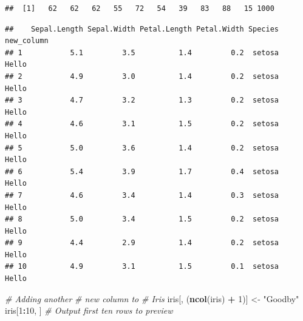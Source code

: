 \documentclass[
]{book}
\newenvironment{Shaded}{\begin{snugshade}}{\end{snugshade}}
\newcommand{\CommentTok}[1]{\textcolor[rgb]{0.56,0.35,0.01}{\textit{#1}}}
\newcommand{\DecValTok}[1]{\textcolor[rgb]{0.00,0.00,0.81}{#1}}
\newcommand{\KeywordTok}[1]{\textcolor[rgb]{0.13,0.29,0.53}{\textbf{#1}}}
\newcommand{\NormalTok}[1]{#1}
\newcommand{\OperatorTok}[1]{\textcolor[rgb]{0.81,0.36,0.00}{\textbf{#1}}}
\newcommand{\StringTok}[1]{\textcolor[rgb]{0.31,0.60,0.02}{#1}}
\begin{document}
\begin{verbatim}
##  [1]   62   62   62   55   72   54   39   83   88   15 1000
\end{verbatim}

\begin{Shaded}
\end{Shaded}

\begin{verbatim}
##    Sepal.Length Sepal.Width Petal.Length Petal.Width Species new_column
## 1           5.1         3.5          1.4         0.2  setosa      Hello
## 2           4.9         3.0          1.4         0.2  setosa      Hello
## 3           4.7         3.2          1.3         0.2  setosa      Hello
## 4           4.6         3.1          1.5         0.2  setosa      Hello
## 5           5.0         3.6          1.4         0.2  setosa      Hello
## 6           5.4         3.9          1.7         0.4  setosa      Hello
## 7           4.6         3.4          1.4         0.3  setosa      Hello
## 8           5.0         3.4          1.5         0.2  setosa      Hello
## 9           4.4         2.9          1.4         0.2  setosa      Hello
## 10          4.9         3.1          1.5         0.1  setosa      Hello
\end{verbatim}

\begin{Shaded}
\begin{Highlighting}[]
\CommentTok{# Adding another}
\CommentTok{# new column to}
\CommentTok{# Iris}
\NormalTok{iris[, (}\KeywordTok{ncol}\NormalTok{(iris) }\OperatorTok{+}
\StringTok{    }\DecValTok{1}\NormalTok{)] <-}\StringTok{ "Goodby"}
\NormalTok{iris[}\DecValTok{1}\OperatorTok{:}\DecValTok{10}\NormalTok{, ]  }\CommentTok{# Output first ten rows to preview }
\end{Highlighting}
\end{Shaded}
\end{document}
